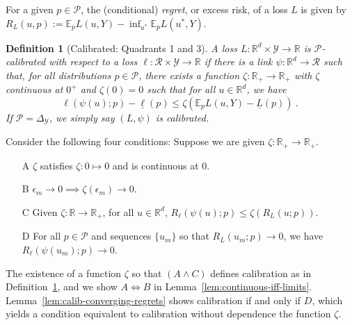 \documentclass[11pt]{article} %
\newcommand{\reals}{\mathbb{R}}
\newcommand{\simplex}{\Delta_\Y}
\newcommand{\E}{\mathbb{E}}
\newcommand{\R}{\mathcal{R}}
\renewcommand{\P}{\mathcal{P}}
\newcommand{\Y}{\mathcal{Y}}
\newcommand{\exploss}[3]{\E_{#3} #1(#2,Y)}
\newcommand{\risk}[1]{\underline{#1}}
\newtheorem{definition}{Definition}
\begin{document}
For a given $p\in\P$, the (conditional) \emph{regret}, or excess risk, of a loss $L$ is given by $R_L(u,p) := \exploss{L}{u}{p} - \inf_{u^*} \exploss{L}{u^*}{p}$.

\begin{definition}[Calibrated: Quadrants 1 and 3]\label{def:calibrated-general}
	A loss $L:\reals^d \times \Y \to \reals$ is \emph{$\P$-calibrated} with respect to a loss $\ell : \R \times \Y \to \reals$ if there is a link $\psi : \reals^d \to \R$ such that, for all distributions $p \in \P$, there exists a function $\zeta : \reals_+ \to \reals_+$ with $\zeta$ continuous at $0^+$ and $\zeta(0) = 0$ such that for all $u \in \reals^d$, we have
	\begin{equation}\label{eq:calibrated-general}
	\ell( \psi(u); p) - \risk{\ell}(p)  \leq \zeta \left(  \exploss{L}{u}{p} - \risk{L}(p) \right)~.~
	\end{equation}
	If $\P = \simplex$, we simply say $(L, \psi)$ is calibrated.
\end{definition}

Consider the following four conditions: Suppose we are given $\zeta:\reals_+ \to \reals_+$.
\begin{enumerate}
	\item [A] $\zeta$ satisfies $\zeta : 0 \mapsto 0$ and is continuous at $0$.
	\item [B] $\epsilon_m \to 0 \implies \zeta(\epsilon_m) \to 0$.
	\item [C] Given $\zeta:\reals \to \reals_+$, for all $u \in \reals^d$, $R_\ell(\psi(u); p) \leq \zeta(R_L(u;p))$.
	\item [D] For all $p \in \P$ and sequences $\{u_m\}$ so that $R_L(u_m; p) \to 0$, we have $R_\ell(\psi(u_m); p) \to 0$.
\end{enumerate}
The existence of a function $\zeta$ so that $(A \wedge C)$ defines calibration as in Definition~\ref{def:calibrated-general}, and we show $A \iff B$ in Lemma~\ref{lem:continuous-iff-limits}.  
Lemma~\ref{lem:calib-converging-regrets} shows calibration if and only if $D$, which yields a condition equivalent to calibration without dependence the function $\zeta$.
\end{document}
